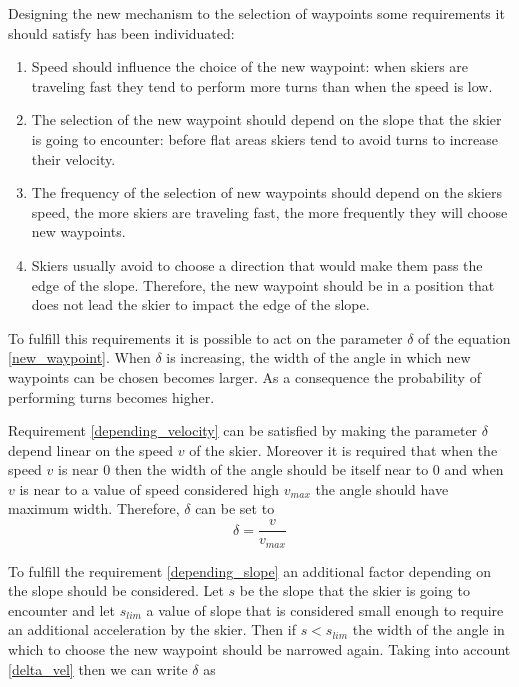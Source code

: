 \documentclass[12pt,a4paper,twoside]{book}
\begin{document}
Designing the new mechanism to the selection of waypoints some requirements it should satisfy has been individuated:\begin{enumerate}
\item \label{depending_velocity} Speed should influence the choice of the new waypoint: when skiers are traveling fast they tend to perform more turns than when the speed is low.
\item \label{depending_slope} The selection of the new waypoint should depend on the slope that the skier is going to encounter: before flat areas skiers tend to avoid turns to increase their velocity.
\item \label{frequency} The frequency of the selection of new waypoints should depend on the skiers speed, the more skiers are traveling fast, the more frequently they will choose new waypoints.
\item \label{avoid_impact} Skiers usually avoid to choose a direction that would make them pass the edge of the slope. Therefore, the new waypoint should be in a position that does not lead the skier to impact the edge of the slope.
\end{enumerate}

To fulfill this requirements it is possible to act on the parameter $\delta$ of the equation \ref{new_waypoint}. When $\delta$ is increasing, the width of the angle in which new waypoints can be chosen becomes larger. As a consequence the probability of performing turns becomes higher.

Requirement \ref{depending_velocity} can be satisfied by making the parameter $\delta$ depend linear on the speed $v$ of the skier. Moreover it is required that when the speed $v$ is near $0$ then the width of the angle should be itself near to $0$ and when $v$ is near to a value of speed considered high $v_{max}$ the angle should have maximum width. Therefore, $\delta$ can be set to
\begin{equation}\label{delta_vel}
\delta= \frac{v}{v_{max}}
\end{equation}

To fulfill the requirement \ref{depending_slope} an additional factor depending on the slope should be considered. Let $s$ be the slope that the skier is going to encounter and let $s_{lim}$ a value of slope that is considered small enough to require an additional acceleration by the skier. Then if $s<s_{lim}$ the width of the angle in which to choose the new waypoint should be narrowed again. Taking into account \ref{delta_vel} then we can write $\delta$ as
\end{document}
